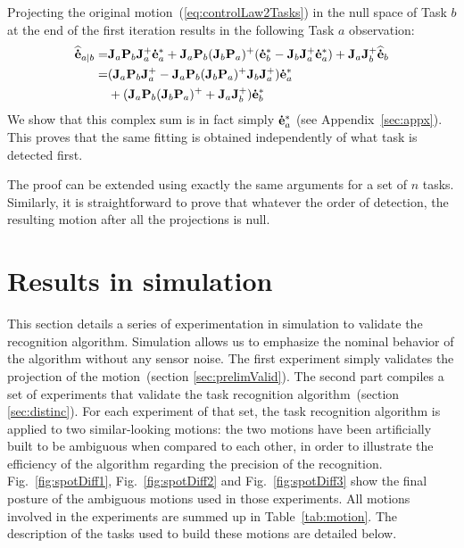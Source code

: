 \documentclass[journal]{IEEEtran}
\begin{document}
Projecting the original motion~(\ref{eq:controlLaw2Tasks}) in the null space of Task $b$ at the
end of the first iteration results in the following Task $a$ observation:
\begin{align*}
{\mathbf{\widehat{\dot{e}}}}_{a|b} =& {\mathbf{J}}_{a} {\mathbf{P}}_{b} {\mathbf{J}}_{a}^+ {\mathbf{\dot{e}}}_{a}^* +
 {\mathbf{J}}_{a} {\mathbf{P}}_{b} ({\mathbf{J}}_{b} {\mathbf{P}}_{a} )^+ ( {\mathbf{\dot{e}}}_{b}^* - {\mathbf{J}}_{b} {\mathbf{J}}_{a}^+ {\mathbf{\dot{e}}}_{a}^*)
+ {\mathbf{J}}_{a} {\mathbf{J}}_{b}^+ {\mathbf{\widehat{\dot{e}}}}_{b} \\
=& ({\mathbf{J}}_{a} {\mathbf{P}}_{b} {\mathbf{J}}_{a}^+ - {\mathbf{J}}_{a} {\mathbf{P}}_{b} ({\mathbf{J}}_{b} {\mathbf{P}}_{a} )^+ {\mathbf{J}}_{b} {\mathbf{J}}_{a}^+) {\mathbf{\dot{e}}}_{a}^* \\
&+ ({\mathbf{J}}_{a} {\mathbf{P}}_{b} ({\mathbf{J}}_{b} {\mathbf{P}}_{a} )^+ + {\mathbf{J}}_{a} {\mathbf{J}}_{b}^+) {\mathbf{\dot{e}}}_{b}^*
\end{align*}
We show that this complex sum is in fact simply ${\mathbf{\dot{e}}}_{a}^*$ (see Appendix~\ref{sec:appx}).
%
This proves that the same fitting is obtained independently of what task is
detected first. \QED


\medskip
 The proof can be extended using exactly the same arguments for
a set of $n$ tasks.
Similarly, it is straightforward to prove that whatever the order of detection,
the resulting motion after all the projections is null.

\section{Results in simulation}
\label{sec:simu}
This section details a series of experimentation in simulation to validate the recognition algorithm.
Simulation allows us to emphasize the nominal behavior of the algorithm without
any sensor noise.
The first experiment simply validates the projection of the motion~(section \ref{sec:prelimValid}).
The second part compiles a set of experiments that validate the task recognition algorithm~(section \ref{sec:distinc}).
For each experiment of that set, the task recognition algorithm
is applied to two similar-looking motions:
the two motions have been artificially built to be ambiguous when
compared to each other, in order to illustrate the
efficiency of the algorithm regarding the precision of the recognition.
Fig.~\ref{fig:spotDiff1},
Fig.~\ref{fig:spotDiff2} and Fig.~\ref{fig:spotDiff3} show the final posture of the ambiguous motions used in those
experiments.
All motions involved in the experiments are summed up in Table~\ref{tab:motion}.
The description of the tasks used to build these motions are detailed below.
\end{document}
